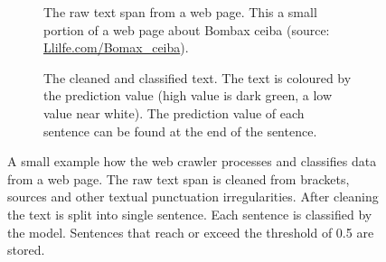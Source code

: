 \documentclass[a4paper, 12pt, oneside]{book} %
\begin{document}
\begin{figure} [t]
     \centering
     \begin{subfigure}[b]{1.00\textwidth}
         \centering
         \caption[Raw text span example]{The raw text span from a web page. This a small portion of a web page about Bombax ceiba (source: \href{http://www.llifle.com/Encyclopedia/TREES/Family/Bombacaceae/31994/Bombax_ceiba}{Llilfe.com/Bomax\_ceiba}).}
         \label{fig:webcrawler_sents_nopred}
     \end{subfigure}
     \vfill
     \begin{subfigure}[b]{1.00\textwidth}
         \centering
         \caption[Cleaned and classified text span example]{The cleaned and classified text. The text is coloured by the prediction value (high value is dark green, a low value near white). The prediction value of each sentence can be found at the end of the sentence.}
         \label{fig:webcrawler_sents_pred}
     \end{subfigure}
     \caption[Example of the web crawler process]{A small example how the web crawler processes and classifies data from a web page. The raw text span is cleaned from brackets, sources and other textual punctuation irregularities. After cleaning the text is split into single sentence. Each sentence is classified by the model. Sentences that reach or exceed the threshold of 0.5 are stored.}
     \label{fig:webcrawler_sents}
\end{figure}
\end{document}
